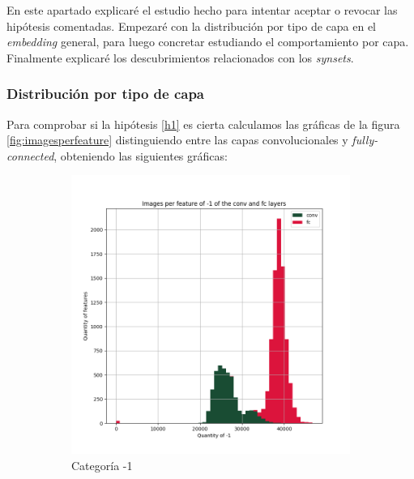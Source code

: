 \documentclass[12,twoside]{TFG-GM}
\theoremstyle{definition}
\theoremstyle{remark}
\begin{document}
En este apartado explicaré el estudio hecho para intentar aceptar o revocar las hipótesis comentadas. Empezaré con la distribución por tipo de capa en el \textit{embedding} general, para luego concretar estudiando el comportamiento por capa. Finalmente explicaré los descubrimientos relacionados con los \textit{synsets}. 
\subsubsection{Distribución por tipo de capa} \label{subsec:distribucionportipodecapa}
Para comprobar si la hipótesis \ref{h1} es cierta calculamos las gráficas de la figura \ref{fig:imagesperfeature} distinguiendo entre las capas convolucionales y \textit{fully-connected}, obteniendo las siguientes gráficas: 

\begin{figure}[ht] 
	\centering
	\begin{subfigure}[b]{0.3\textwidth}
		\includegraphics[width=\textwidth] {Images/plots/25/Images_per_feature_of_-1_category_all_layers.png}
		\caption{Categoría -1}
	\end{subfigure}
	\begin{subfigure}[b]{0.3\textwidth}

\end{subfigure}
\end{figure}
\end{document}
